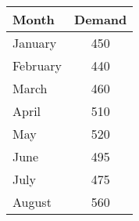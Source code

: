 \begin{tabular}{|l|c|}
\hline
Month    & Demand \\
\hline
January  & 450    \\
\hline
February & 440    \\
\hline
March    & 460    \\
\hline
April    & 510    \\
\hline
May      & 520    \\
\hline
June     & 495    \\
\hline
July     & 475    \\
\hline
August   & 560    \\
\hline

\end{tabular}
